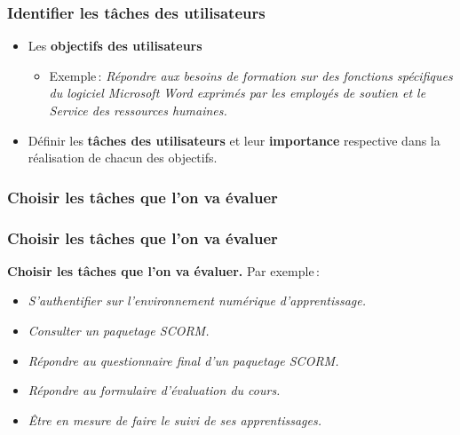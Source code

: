 	\subsubsection{Identifier les tâches des utilisateurs} 
		\begin{frame}[allowframebreaks]
			\begin {itemize}
			\frametitle{Identifier les tâches des utilisateurs \citep{ergolab2014a}}
				      \item Les \textbf{objectifs des utilisateurs}
						\begin {itemize}
						\item Exemple\,: \textit{Répondre aux besoins de formation sur des fonctions spécifiques du logiciel Microsoft Word exprimés par les employés de soutien et le Service des ressources humaines.}
						\end{itemize}
					\item Définir les \textbf{tâches des utilisateurs} et leur \textbf{importance} respective dans la réalisation de chacun des objectifs.
					
					\end{itemize}
		\end{frame}    
	\subsubsection{Choisir les tâches que l’on va évaluer} 
		\begin{frame}[allowframebreaks]
		\frametitle{Choisir les tâches que l’on va évaluer}
			\textbf{Choisir les tâches que l’on va évaluer.} Par exemple\,:
			\begin {itemize}
				     		\item \textit{S’authentifier sur l’environnement numérique d’apprentissage.}
						\item \textit{Consulter un paquetage SCORM.}
						\item \textit{Répondre au questionnaire final d’un paquetage SCORM.}
						\item \textit{Répondre au formulaire d’évaluation du cours.}
						\item \textit{Être en mesure de faire le suivi de ses apprentissages.}
			\end{itemize}
		\end{frame}  
		
